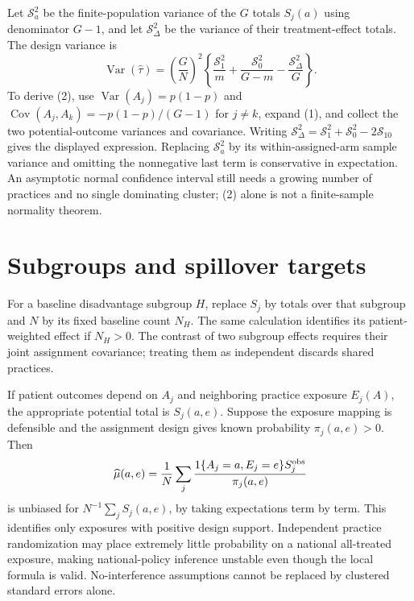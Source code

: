 \documentclass[11pt]{article}
\newcommand{\Var}{\operatorname{Var}}
\newcommand{\Cov}{\operatorname{Cov}}
\begin{document}
Let $\mathcal S_a^2$ be the finite-population variance of the $G$ totals $S_j(a)$ using denominator $G-1$, and let $\mathcal S_\Delta^2$ be the variance of their treatment-effect totals. The design variance is
\[
 \Var(\widehat\tau)=\left(\frac GN\right)^2
 \left\{\frac{\mathcal S_1^2}{m}
       +\frac{\mathcal S_0^2}{G-m}
       -\frac{\mathcal S_\Delta^2}{G}\right\}. \tag{2}
\]
To derive (2), use $\Var(A_j)=p(1-p)$ and
$\Cov(A_j,A_k)=-p(1-p)/(G-1)$ for $j\ne k$, expand (1), and collect the two potential-outcome variances and covariance. Writing
$\mathcal S_\Delta^2=\mathcal S_1^2+\mathcal S_0^2-2\mathcal S_{10}$ gives the displayed expression. Replacing $\mathcal S_a^2$ by its within-assigned-arm sample variance and omitting the nonnegative last term is conservative in expectation. An asymptotic normal confidence interval still needs a growing number of practices and no single dominating cluster; (2) alone is not a finite-sample normality theorem.

\section*{Subgroups and spillover targets}
For a baseline disadvantage subgroup $H$, replace $S_j$ by totals over that subgroup and $N$ by its fixed baseline count $N_H$. The same calculation identifies its patient-weighted effect if $N_H>0$. The contrast of two subgroup effects requires their joint assignment covariance; treating them as independent discards shared practices.

If patient outcomes depend on $A_j$ and neighboring practice exposure $E_j(A)$, the appropriate potential total is $S_j(a,e)$. Suppose the exposure mapping is defensible and the assignment design gives known probability $\pi_j(a,e)>0$. Then
\[
 \widehat\mu(a,e)=\frac1N\sum_j
 \frac{1\{A_j=a,E_j=e\}S_j^{\rm obs}}{\pi_j(a,e)}
\]
is unbiased for $N^{-1}\sum_jS_j(a,e)$, by taking expectations term by term. This identifies only exposures with positive design support. Independent practice randomization may place extremely little probability on a national all-treated exposure, making national-policy inference unstable even though the local formula is valid. No-interference assumptions cannot be replaced by clustered standard errors alone.
\end{document}
